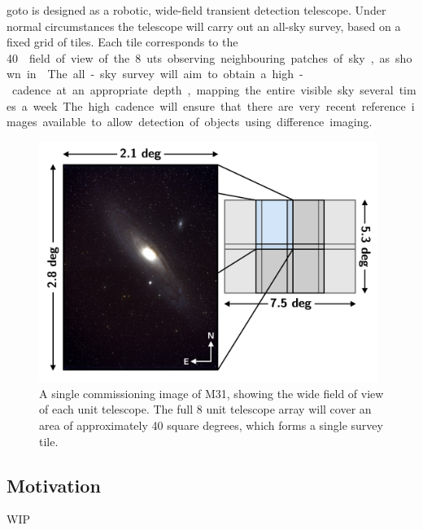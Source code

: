 \begin{colsection}
\begin{colsection}
\gls{goto} is designed as a robotic, wide-field transient detection telescope. Under normal circumstances the telescope will carry out an all-sky survey, based on a fixed grid of tiles. Each tile corresponds to the \SI{40}{\square\deg} field of view of the 8 \glspl{ut} observing neighbouring patches of sky, as shown in . The all-sky survey will aim to obtain a high-cadence at an appropriate depth, mapping the entire visible sky several times a week. The high cadence will ensure that there are very recent reference images available to allow detection of objects using difference imaging.

\begin{figure}[htb]
\begin{center}
\includegraphics[width=11cm]{images/tiles.pdf}
\end{center}
\caption[M31]{A single commissioning image of M31, showing the wide field of view of each unit telescope. The full 8 unit telescope array will cover an area of approximately 40 square degrees, which forms a single survey tile.}
\label{fig:tiles}
\end{figure}

\end{colsection}


\subsection{Motivation}
\label{sec:goto_motivation}
\begin{colsection}

WIP

\end{colsection}



\end{colsection}
